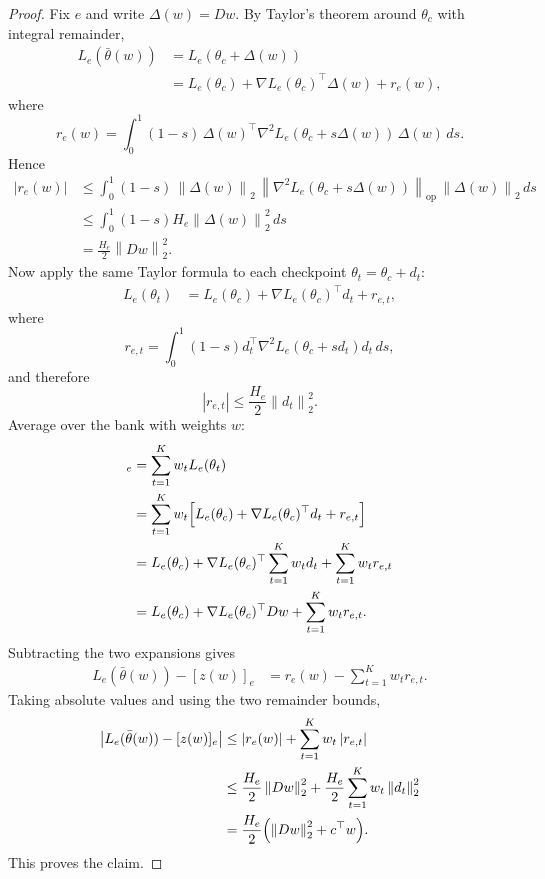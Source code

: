 \documentclass[11pt]{article}
\newcommand{\1}{\mathbf{1}}
\newcommand{\norm}[1]{\left\lVert #1 \right\rVert}
\newcommand{\abs}[1]{\left\lvert #1 \right\rvert}
\theoremstyle{plain}
\theoremstyle{definition}
\theoremstyle{remark}
\begin{document}
\begin{proof}
Fix $e$ and write $\Delta(w)=Dw$. By Taylor's theorem around $\theta_c$ with integral remainder,
\begin{align*}
L_e(\bar\theta(w))
&= L_e(\theta_c + \Delta(w)) \\
&= L_e(\theta_c) + \nabla L_e(\theta_c)^\top \Delta(w)
+ r_e(w),
\end{align*}
where
\[
r_e(w)
= \int_0^1 (1-s)\,\Delta(w)^\top \nabla^2 L_e(\theta_c + s\Delta(w))\,\Delta(w)\,ds.
\]
Hence
\begin{align*}
\abs{r_e(w)}
&\le \int_0^1 (1-s)\,\norm{\Delta(w)}_2\,\norm{\nabla^2 L_e(\theta_c + s\Delta(w))}_{\mathrm{op}}\,\norm{\Delta(w)}_2\,ds \\
&\le \int_0^1 (1-s) H_e \norm{\Delta(w)}_2^2 \, ds \\
&= \frac{H_e}{2}\norm{Dw}_2^2.
\end{align*}
Now apply the same Taylor formula to each checkpoint $\theta_t = \theta_c + d_t$:
\begin{align*}
L_e(\theta_t)
&= L_e(\theta_c) + \nabla L_e(\theta_c)^\top d_t + r_{e,t},
\end{align*}
where
\[
r_{e,t} = \int_0^1 (1-s) d_t^\top \nabla^2 L_e(\theta_c + s d_t)d_t\,ds,
\]
and therefore
\[
\abs{r_{e,t}} \le \frac{H_e}{2}\norm{d_t}_2^2.
\]
Average over the bank with weights $w$:
\begin{align*}
[z(w)]_e
&= \sum_{t=1}^K w_t L_e(\theta_t) \\
&= \sum_{t=1}^K w_t\Bigl[L_e(\theta_c) + \nabla L_e(\theta_c)^\top d_t + r_{e,t}\Bigr] \\
&= L_e(\theta_c) + \nabla L_e(\theta_c)^\top \sum_{t=1}^K w_t d_t + \sum_{t=1}^K w_t r_{e,t} \\
&= L_e(\theta_c) + \nabla L_e(\theta_c)^\top Dw + \sum_{t=1}^K w_t r_{e,t}.
\end{align*}
Subtracting the two expansions gives
\begin{align*}
L_e(\bar\theta(w)) - [z(w)]_e
&= r_e(w) - \sum_{t=1}^K w_t r_{e,t}.
\end{align*}
Taking absolute values and using the two remainder bounds,
\begin{align*}
\abs{L_e(\bar\theta(w)) - [z(w)]_e}
&\le \abs{r_e(w)} + \sum_{t=1}^K w_t \abs{r_{e,t}} \\
&\le \frac{H_e}{2}\norm{Dw}_2^2 + \frac{H_e}{2}\sum_{t=1}^K w_t \norm{d_t}_2^2 \\
&= \frac{H_e}{2}\Bigl(\norm{Dw}_2^2 + c^\top w\Bigr).
\end{align*}
This proves the claim.
\end{proof}
\end{document}
